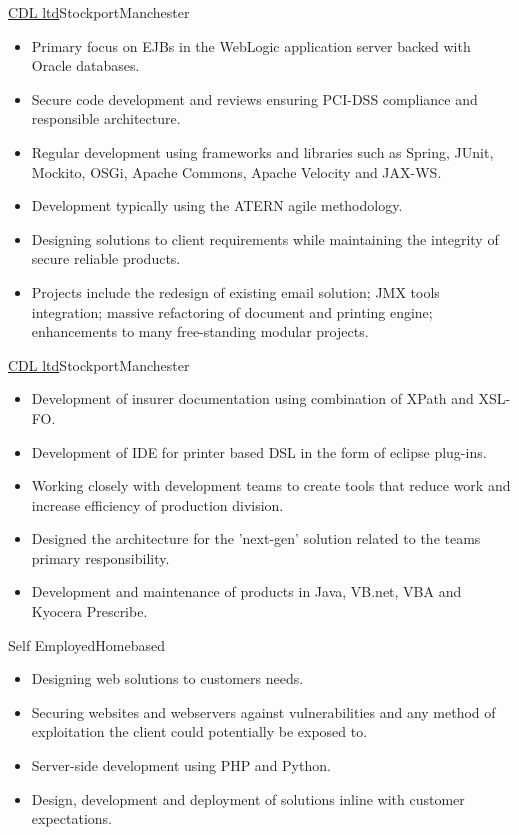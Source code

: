 \documentclass[a4paper,10pt]{moderncv}
\newcommand\weblink[2] {{\color{href} \href{#1}{#2}}}
\begin{document}
{\weblink{http://www.cdl.co.uk}{CDL ltd}}{Stockport}{Manchester}{
\begin{itemize}
  \item Primary focus on EJBs in the WebLogic application server backed with Oracle databases.
  \item Secure code development and reviews ensuring PCI-DSS compliance and responsible architecture.
  \item Regular development using frameworks and libraries such as Spring, JUnit, Mockito, OSGi, Apache Commons, Apache Velocity and JAX-WS.
  \item Development typically using the ATERN agile methodology.
  \item Designing solutions to client requirements while maintaining the integrity of secure reliable products.
  \item Projects include the redesign of existing email solution; JMX tools integration; massive refactoring of document and printing engine; enhancements to many free-standing modular projects.
\end{itemize}
}

{\weblink{http://www.cdl.co.uk}{CDL ltd}}{Stockport}{Manchester}{
\begin{itemize}
  \item Development of insurer documentation using combination of XPath and XSL-FO.
  \item Development of IDE for printer based DSL in the form of eclipse plug-ins.
  \item Working closely with development teams to create tools that reduce work and increase efficiency of production division.
  \item Designed the architecture for the 'next-gen' solution related to the teams primary responsibility.
  \item Development and maintenance of products in Java, VB.net, VBA and Kyocera Prescribe.
\end{itemize}
}

{Self Employed}{Homebased}{}{
\begin{itemize}
  \item Designing web solutions to customers needs.
  \item Securing websites and webservers against vulnerabilities and any method of exploitation the client could potentially be exposed to.
  \item Server-side development using PHP and Python.
  \item Design, development and deployment of solutions inline with customer expectations.
\end{itemize}
}
\end{document}
